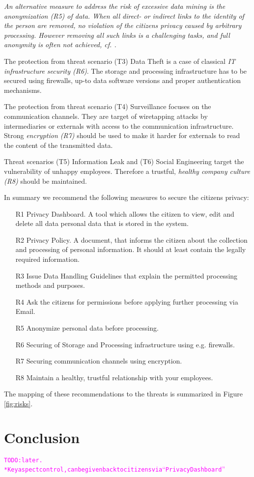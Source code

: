 \documentclass[runningheads,a4paper]{llncs}
\newcommand{\TODO}[1]{\begin{alltt}\textcolor{magenta}{TODO: #1}\end{alltt}}
\newenvironment{LGContent}
{ \par\color{blue} \it \small }
{ \par }
\begin{document}
\begin{LGContent}
An alternative measure to address the risk of excessive data mining is
the \emph{anonymization (R5)} of data. When all direct- or indirect
links to the identity of the person are removed, no violation of the
citizens privacy caused by arbitrary processing. However removing all
such links is a challenging tasks, and full anonymity is often not
achieved, cf. \cite{krumm2009}.

The protection from threat scenario (T3) Data Theft is a case of
classical \emph{IT infrastructure security (R6)}. The storage and processing infrastructure has
to be secured using firewalls, up-to data software versions and proper
authentication mechanisms.

The protection from threat scenario (T4) Surveillance focuses on the
communication channels. They are target of wiretapping attacks by
intermediaries or externals with access to the communication
infrastructure. Strong \emph{encryption (R7)} should be used to make
it harder for externals to read the content of the transmitted data.

Threat scenarios (T5) Information Leak and (T6) Social Engineering
target the vulnerability of unhappy employees. Therefore a trustful,
\emph{healthy company culture (R8)} should be maintained.

In summary we recommend the following measures to secure the citizens
privacy:
\begin{enumerate}
\item[R1] Privacy Dashboard. A tool which allows the citizen to view, edit
  and delete all data personal data that is stored in the system.
\item[R2] Privacy Policy. A document, that informs the citizen about the
  collection and processing of personal information. It should at
  least contain the legally required information.
\item[R3] Issue Data Handling Guidelines that explain the permitted
  processing methods and purposes.
\item[R4] Ask the citizens for permissions before applying further
  processing via Email.
\item[R5] Anonymize personal data before processing.
\item[R6] Securing of Storage and Processing infrastructure using e.g. firewalls.
\item[R7] Securing communication channels using encryption.
\item[R8] Maintain a healthy, trustful relationship with your employees.
\end{enumerate}
The mapping of these recommendations to the threats is summarized in Figure \ref{fig:risks}.
\end{LGContent}




\section{Conclusion}

\TODO{later.\\
* Key aspect control, can be given back to citizens via ``Privacy Dashboard''
}


{}
\end{document}
